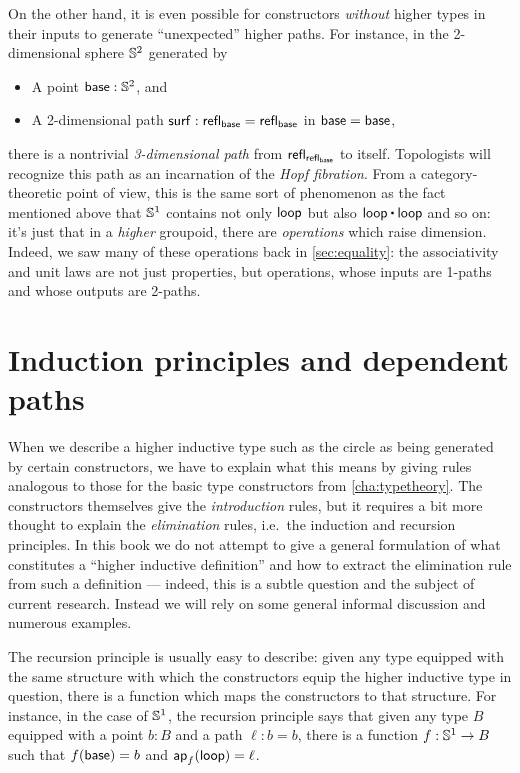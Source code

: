 On the other hand, it is even possible for constructors \emph{without} higher types in their inputs to generate ``unexpected'' higher paths.
For instance, in the 2-dimensional sphere $\mathbb{S}^2$ generated by
%
\begin{itemize}
\item A point $\mathsf{base}:\mathbb{S}^2$, and
\item A 2-dimensional path $\mathsf{surf}:\mathsf{refl}_{\mathsf{base}} = \mathsf{refl}_{\mathsf{base}}$ in ${\mathsf{base}=\mathsf{base}}$,
\end{itemize}
there is a nontrivial \emph{3-dimensional path} from $\mathsf{refl}_{\mathsf{refl}_{\mathsf{base}}}$ to itself.
Topologists will recognize this path as an incarnation of the \emph{Hopf fibration}.
From a category-theoretic point of view, this is the same sort of phenomenon as the fact mentioned above that $\mathbb{S}^1$ contains not only $\mathsf{loop}$ but also $\lloop\ct\lloop$ and so on: it's just that in a \emph{higher} groupoid, there are \emph{operations} which raise dimension.
Indeed, we saw many of these operations back in \autoref{sec:equality}: the associativity and unit laws are not just properties, but operations, whose inputs are 1-paths and whose outputs are 2-paths.

\vspace*{0pt plus 20ex}

\section{Induction principles and dependent paths}
\label{sec:dependent-paths}

When we describe a higher inductive type such as the circle as being generated by certain constructors, we have to explain what this means by giving rules analogous to those for the basic type constructors from \autoref{cha:typetheory}.
The constructors themselves give the \emph{introduction} rules, but it requires a bit more thought to explain the \emph{elimination} rules, i.e.\ the induction and recursion principles.
In this book we do not attempt to give a general formulation of what constitutes a ``higher inductive definition'' and how to extract the elimination rule from such a definition --- indeed, this is a subtle question and the subject of current research.
Instead we will rely on some general informal discussion and numerous examples.

%
%
The recursion principle is usually easy to describe: given any type equipped with the same structure with which the constructors equip the higher inductive type in question, there is a function which maps the constructors to that structure.
For instance, in the case of $\mathbb{S}^1$, the recursion principle says that given any type $B$ equipped with a point $b:B$ and a path $\ell:b=b$, there is a function $f:\mathbb{S}^1\to B$ such that $f(\mathsf{base})=b$ and $\mathsf{ap}_{f} (\mathsf{loop}) = \ell$.

